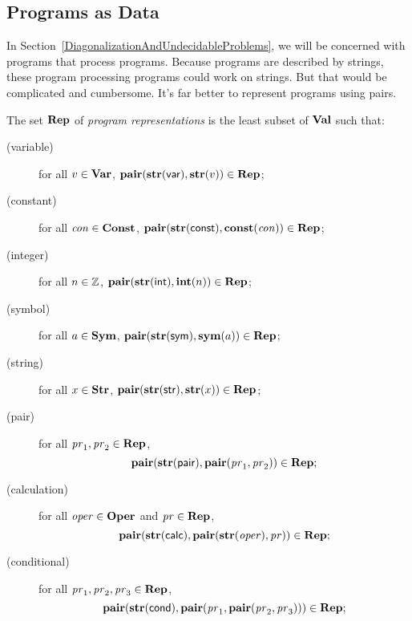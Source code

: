 \subsection{Programs as Data}

%
In Section~\ref{DiagonalizationAndUndecidableProblems}, we will be
concerned with programs that process programs.  Because programs
are described by strings, these program processing programs could
work on strings.  But that would be complicated and cumbersome.  It's
far better to represent programs using pairs.

%
%
The set $\mathbf{Rep}$ of \emph{program representations} is the least subset of
$\mathbf{Val}$ such that:
\begin{description}
\item[\quad(variable)] for all $v\in\mathbf{Var}$,
  $\mathbf{pair}(\mathbf{str}(\mathsf{var}), \mathbf{str}(v)) \in \mathbf{Rep}$;

\item[\quad(constant)] for all $\mathit{con}\in\mathbf{Const}$,
  $\mathbf{pair}(\mathbf{str}(\mathsf{const}), \mathbf{const}(\mathit{con}))\in\mathbf{Rep}$;

\item[\quad(integer)] for all $n\in\mathbb{Z}$, 
  $\mathbf{pair}(\mathbf{str}(\mathsf{int}), \mathbf{int}(n))\in\mathbf{Rep}$;

\item[\quad(symbol)] for all $a\in\mathbf{Sym}$,
  $\mathbf{pair}(\mathbf{str}(\mathsf{sym}), \mathbf{sym}(a))\in\mathbf{Rep}$;

\item[\quad(string)] for all $x\in\mathbf{Str}$,
  $\mathbf{pair}(\mathbf{str}(\mathsf{str}),\mathbf{str}(x))\in\mathbf{Rep}$;

\item[\quad(pair)] for all $\mathit{pr}_1,\mathit{pr}_2\in\mathbf{Rep}$,
  \begin{displaymath}
    \mathbf{pair}(\mathbf{str}(\mathsf{pair}),
    \mathbf{pair}(\mathit{pr}_1, \mathit{pr}_2)) \in \mathbf{Rep} ;
  \end{displaymath}

\item[\quad(calculation)] for all $\mathit{oper}\in\mathbf{Oper}$ and
  $\mathit{pr}\in\mathbf{Rep}$,
  \begin{displaymath}
    \mathbf{pair}(\mathbf{str}(\mathsf{calc}),
    \mathbf{pair}(\mathbf{str}(\mathit{oper}), \mathit{pr})) \in \mathbf{Rep} ;
  \end{displaymath}

\item[\quad(conditional)] for all $\mathit{pr}_1,\mathit{pr}_2,\mathit{pr}_3\in\mathbf{Rep}$,
  \begin{displaymath}
    \mathbf{pair}(\mathbf{str}(\mathsf{cond}),
    \mathbf{pair}(\mathit{pr}_1, \mathbf{pair}(\mathit{pr}_2, \mathit{pr}_3))) \in \mathbf{Rep} ;
  \end{displaymath}


\end{description}
